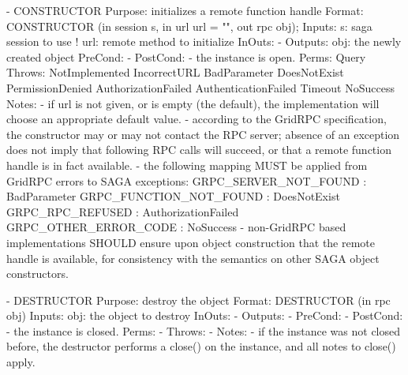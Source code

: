  
 \begin{myspec}
    - CONSTRUCTOR
      Purpose:  initializes a remote function handle
      Format:   CONSTRUCTOR  (in  session   s, 
                              in  url       url = "", 
                              out rpc       obj);
      Inputs:   s:            saga session to use
!               url:          remote method to
                              initialize
      InOuts:   -
      Outputs:  obj:          the newly created object
      PreCond:  -
      PostCond: - the instance is open.
      Perms:    Query
      Throws:   NotImplemented
                IncorrectURL
                BadParameter
                DoesNotExist
                PermissionDenied
                AuthorizationFailed
                AuthenticationFailed
                Timeout
                NoSuccess
      Notes:    - if url is not given, or is empty (the 
                  default), the implementation will choose an 
                  appropriate default value.
                - according to the GridRPC specification, the 
                  constructor may or may not contact the RPC
                  server; absence of an exception does not imply
                  that following RPC calls will succeed, or that
                  a remote function handle is in fact available.
                - the following mapping MUST be applied from
                  GridRPC errors to SAGA exceptions:
                  GRPC_SERVER_NOT_FOUND   : BadParameter
                  GRPC_FUNCTION_NOT_FOUND : DoesNotExist
                  GRPC_RPC_REFUSED        : AuthorizationFailed
                  GRPC_OTHER_ERROR_CODE   : NoSuccess
                - non-GridRPC based implementations SHOULD ensure
                  upon object construction that the remote handle
                  is available, for consistency with the
                  semantics on other SAGA object constructors.
 
    - DESTRUCTOR
      Purpose:  destroy the object
      Format:   DESTRUCTOR           (in  rpc  obj)
      Inputs:   obj:                  the object to destroy
      InOuts:   -
      Outputs:  -
      PreCond:  - 
      PostCond: - the instance is closed.
      Perms:    -
      Throws:   - 
      Notes:    - if the instance was not closed before, the 
                  destructor performs a close() on the instance,
                  and all notes to close() apply.
 

\end{myspec}
